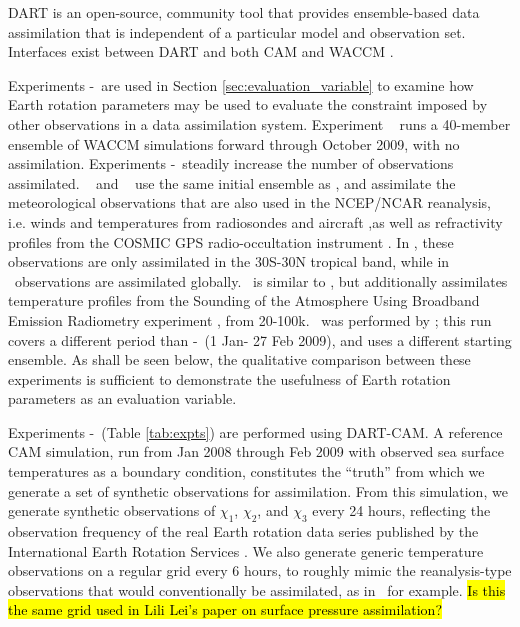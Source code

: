 DART \citep{Anderson2009} is an open-source, community tool that provides ensemble-based data assimilation that is independent of a particular model and observation set.
Interfaces exist between DART and both CAM \citep{Raeder2012} and WACCM \citep{Pedatella2013}.

Experiments \WACCMNODA-\NCARFULL ~are used in Section \ref{sec:evaluation_variable} to examine how Earth rotation parameters may be used to evaluate the constraint imposed by other observations in a data assimilation system.  
Experiment \WACCMNODA~ runs a 40-member ensemble of WACCM simulations forward through October 2009, with no assimilation. 
Experiments \WACCMTROPICS-\NCARFULL ~steadily increase the number of observations assimilated. 
\WACCMTROPICS~ and \WACCMGLOBAL~ use the same initial ensemble as \WACCMNODA, and assimilate the meteorological observations that are also used in the NCEP/NCAR reanalysis, i.e. winds and temperatures from radiosondes and aircraft \citep{Saha2010},as well as refractivity profiles from the COSMIC GPS radio-occultation instrument \citep{Anthes2008}.
In \WACCMTROPICS, these observations are only assimilated in the 30S-30N tropical band, while in \WACCMGLOBAL ~observations are assimilated globally. 
\NCARFULL ~is similar to \WACCMGLOBAL, but additionally assimilates temperature profiles from the Sounding of the Atmosphere Using Broadband Emission Radiometry experiment \citep[SABER]{Russell2009}, from 20-100k.
\NCARFULL ~was performed by \citet{Pedatella2014}; this run covers a different period than \WACCMNODA-\WACCMTROPICS ~(1 Jan- 27 Feb 2009), and uses a different starting ensemble.  
As shall be seen below, the qualitative comparison between these experiments is sufficient to demonstrate the usefulness of Earth rotation parameters as an evaluation variable. 

Experiments \NODA-\ERPRST ~(Table \ref{tab:expts}) are performed using DART-CAM.  
A reference CAM simulation, run from Jan 2008 through Feb 2009 with observed sea surface temperatures as a boundary condition, constitutes the ``truth'' from which we generate a set of synthetic observations for assimilation. 
From this simulation, we generate synthetic observations of $\chi_1$, $\chi_2$, and $\chi_3$ every 24 hours, reflecting the observation frequency of the real Earth rotation data series published by the International Earth Rotation Services \citep{iers}.  
We also generate generic temperature observations on a regular grid every 6 hours, to roughly mimic the reanalysis-type observations that would conventionally be assimilated, as in \WACCMGLOBAL ~for example. 
\hl{Is this the same grid used in Lili Lei's paper on surface pressure assimilation?}

